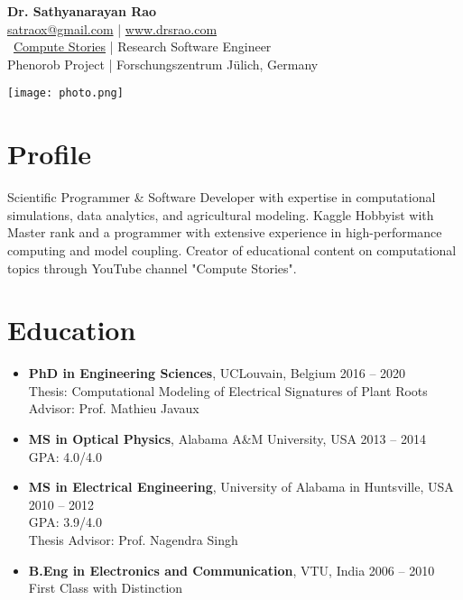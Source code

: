 \documentclass[11pt,a4paper]{article}
\begin{document}
\begin{minipage}{0.7\textwidth}
    {\LARGE \textbf{Dr. Sathyanarayan Rao}} \\
    \vspace{2mm}
    \href{mailto:satraox@gmail.com}{satraox@gmail.com} | \href{http://www.drsrao.com}{www.drsrao.com} \\
    \faYoutube\ \href{https://youtube.com/@ComputeStories}{Compute Stories} | 
    Research Software Engineer \\
    Phenorob Project | Forschungszentrum Jülich, Germany
\end{minipage}
\begin{minipage}{0.3\textwidth}
    \texttt{[image: photo.png]}  %
\end{minipage}

\vspace{5mm}

\section*{Profile}
Scientific Programmer \& Software Developer with expertise in computational simulations, data analytics, and agricultural modeling. Kaggle Hobbyist with Master rank and a programmer with extensive experience in high-performance computing and model coupling. Creator of educational content on computational topics through YouTube channel "Compute Stories".

\section*{Education}
\begin{itemize}[leftmargin=*]
    \item \textbf{PhD in Engineering Sciences}, UCLouvain, Belgium \hfill 2016 -- 2020 \\
          Thesis: Computational Modeling of Electrical Signatures of Plant Roots \\
          Advisor: Prof. Mathieu Javaux
    \item \textbf{MS in Optical Physics}, Alabama A\&M University, USA \hfill 2013 -- 2014 \\
          GPA: 4.0/4.0
    \item \textbf{MS in Electrical Engineering}, University of Alabama in Huntsville, USA \hfill 2010 -- 2012 \\
          GPA: 3.9/4.0 \\
          Thesis Advisor: Prof. Nagendra Singh
    \item \textbf{B.Eng in Electronics and Communication}, VTU, India \hfill 2006 -- 2010 \\
          First Class with Distinction
\end{itemize}
\end{document}
